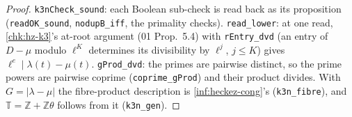 \begin{proof}
  \leanok
  \texttt{k3nCheck\_sound}: each Boolean sub-check is read back as its proposition (\texttt{readOK\_sound}, \texttt{nodupB\_iff}, the primality
  checks). \texttt{read\_lower}: at one read, \ref{chk:hz-k3}'s at-root argument (01 Prop.~5.4) with \texttt{rEntry\_dvd} (an entry of $D-\mu$
  modulo $\ell^K$ determines its divisibility by $\ell^j$, $j\le K$) gives $\ell^e\mid\lambda(t)-\mu(t)$. \texttt{gProd\_dvd}: the primes are
  pairwise distinct, so the prime powers are pairwise coprime (\texttt{coprime\_gProd}) and their product divides. With $G=|\lambda-\mu|$ the
  fibre-product description is \ref{inf:heckez-cong}'s (\texttt{k3n\_fibre}), and $\mathbb T=\mathbb Z+\mathbb Z\theta$ follows from it (\texttt{k3n\_gen}).
\end{proof}


